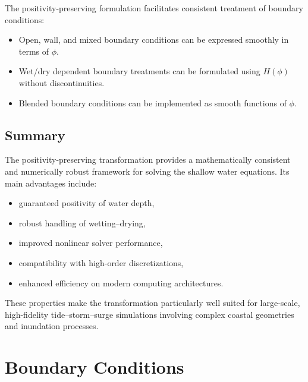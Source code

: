 \documentclass[11pt]{article}
\begin{document}
The positivity-preserving formulation facilitates consistent treatment of boundary conditions:
\begin{itemize}[leftmargin=2em]
    \item Open, wall, and mixed boundary conditions can be expressed smoothly in terms of $\phi$.
    \item Wet/dry dependent boundary treatments can be formulated using $H(\phi)$ without discontinuities.
    \item Blended boundary conditions can be implemented as smooth functions of $\phi$.
\end{itemize}

\subsection{Summary}

The positivity-preserving transformation provides a mathematically consistent and numerically robust framework for solving the shallow water equations. Its main advantages include:
\begin{itemize}[leftmargin=2em]
    \item guaranteed positivity of water depth,
    \item robust handling of wetting--drying,
    \item improved nonlinear solver performance,
    \item compatibility with high-order discretizations,
    \item enhanced efficiency on modern computing architectures.
\end{itemize}

These properties make the transformation particularly well suited for large-scale, high-fidelity tide--storm--surge simulations involving complex coastal geometries and inundation processes.

\section{Boundary Conditions}
\end{document}
